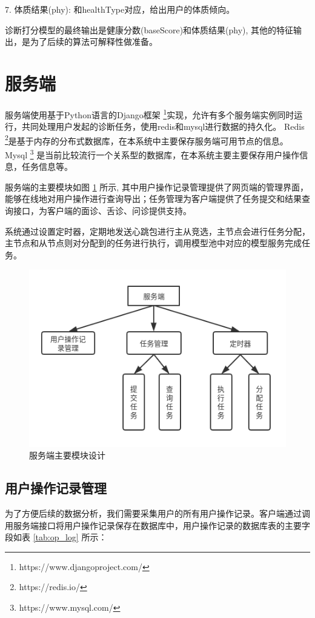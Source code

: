 7. 体质结果(phy): 和healthType对应，给出用户的体质倾向。

诊断打分模型的最终输出是健康分数(baseScore)和体质结果(phy), 其他的特征输出，是为了后续的算法可解释性做准备。


\section{服务端}

服务端使用基于Python语言的Django框架 \footnote{https://www.djangoproject.com/}实现，允许有多个服务端实例同时运行，共同处理用户发起的诊断任务，使用redis和mysql进行数据的持久化。
Redis \footnote{https://redis.io/}是基于内存的分布式数据库，在本系统中主要保存服务端可用节点的信息。
Mysql \footnote{https://www.mysql.com/} 是当前比较流行一个关系型的数据库，在本系统主要主要保存用户操作信息，任务信息等。       

服务端的主要模块如图 \ref{fig:server} 所示, 其中用户操作记录管理提供了网页端的管理界面，能够在线地对用户操作进行查询导出；任务管理为客户端提供了任务提交和结果查询接口，为客户端的面诊、舌诊、问诊提供支持。

系统通过设置定时器，定期地发送心跳包进行主从竞选，主节点会进行任务分配，主节点和从节点则对分配到的任务进行执行，调用模型池中对应的模型服务完成任务。


\begin{figure}[ht]
    \centering
    \includegraphics[width=12cm]{images/server.png}
    \caption{服务端主要模块设计}
    \label{fig:server}
\end{figure}


\subsection{用户操作记录管理}
为了方便后续的数据分析，我们需要采集用户的所有用户操作记录。客户端通过调用服务端接口将用户操作记录保存在数据库中，用户操作记录的数据库表的主要字段如表 \ref{tab:op_log} 所示：

